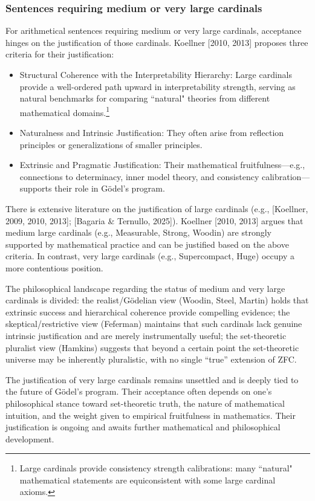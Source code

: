 \documentclass[a4paper,12pt]{amsart}
\theoremstyle{definition}
\numberwithin{equation}{section}
\begin{document}
\subsubsection{Sentences requiring medium or very large cardinals} 
For arithmetical sentences requiring medium or very large cardinals, 
acceptance hinges on the justification of those cardinals.   Koellner [2010, 2013] proposes three criteria for their justification:
\begin{itemize}
 \item Structural Coherence with the Interpretability Hierarchy: Large cardinals provide a well-ordered path upward in interpretability strength, serving as natural benchmarks for comparing ``natural" theories from different mathematical domains.\footnote{Large cardinals provide consistency strength calibrations: many ``natural" mathematical statements are equiconsistent with some large cardinal axioms.}
  \item Naturalness and Intrinsic Justification: 
      They often arise from reflection principles or generalizations of smaller principles.
  \item Extrinsic and Pragmatic Justification: Their mathematical fruitfulness—e.g., connections to determinacy, inner model theory, and consistency calibration—supports their role in Gödel's program.
\end{itemize}

There is extensive literature on the justification of large cardinals (e.g., [Koellner, 2009, 2010, 2013]; [Bagaria \& Ternullo, 2025]). Koellner [2010, 2013] argues that medium large cardinals (e.g., Measurable, Strong, Woodin) are strongly supported by mathematical practice and can be justified based on the above criteria. 
In contrast, very large cardinals (e.g., Supercompact, Huge) occupy a more contentious position.

The philosophical landscape regarding the status of medium and very large cardinals is divided: the realist/G\"odelian view 
(Woodin, Steel, Martin) holds that extrinsic success and hierarchical 
coherence provide compelling evidence; the skeptical/restrictive view 
(Feferman) maintains that such cardinals lack genuine intrinsic 
justification and are merely instrumentally useful;   the set-theoretic 
pluralist view (Hamkins) suggests that beyond a certain point the 
set-theoretic universe may be inherently pluralistic, with no single 
``true'' extension of {\sf ZFC}. 

The justification of very large cardinals remains unsettled and is deeply tied to the future of Gödel's program. Their acceptance often depends on one's philosophical stance toward set-theoretic truth, the nature of mathematical intuition, and the weight given to empirical fruitfulness in mathematics. Their justification is ongoing and awaits further mathematical and philosophical development.
\end{document}
